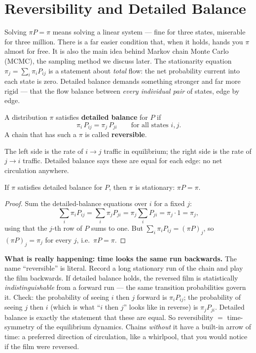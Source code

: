 \section{Reversibility and Detailed Balance}
\label{ch24:reversibility}
Solving $\pi P = \pi$ means solving a linear system --- fine for three states,
miserable for three million. There is a far easier condition that, when
it holds, hands you $\pi$ almost for free. It is also the main idea behind Markov chain Monte Carlo (MCMC), the sampling method we discuss later.
The stationarity equation $\pi_j = \sum_i \pi_i P_{ij}$ is a statement about
\emph{total} flow: the net probability current into each state is zero. Detailed
balance demands something stronger and far more rigid --- that the flow balance
between \emph{every individual pair} of states, edge by edge.
\begin{definition}
\label{ch24:def-detailed-balance}
A distribution $\pi$ satisfies \textbf{detailed balance} for $P$ if
\[
  \pi_i\, P_{ij} = \pi_j\, P_{ji} \qquad \text{for all states } i,j .
\]
A chain that has such a $\pi$ is called \textbf{reversible}.
\end{definition}
The left side is the rate of $i\to j$ traffic in equilibrium; the right side is
the rate of $j\to i$ traffic. Detailed balance says these are equal for each edge:
no net circulation anywhere.
\begin{theorem}
\label{ch24:thm-db-implies-stationary}
If $\pi$ satisfies detailed balance for $P$, then $\pi$ is stationary: $\pi P = \pi$.
\end{theorem}
\begin{proof}
Sum the detailed-balance equations over $i$ for a fixed $j$:
\[
  \sum_i \pi_i P_{ij} = \sum_i \pi_j P_{ji} = \pi_j \sum_i P_{ji} = \pi_j \cdot 1 = \pi_j ,
\]
using that the $j$-th row of $P$ sums to one. But $\sum_i \pi_i P_{ij} = (\pi P)_j$,
so $(\pi P)_j = \pi_j$ for every $j$, i.e.\ $\pi P = \pi$.
\end{proof}
\begin{happeningbox}
\textbf{What is really happening: time looks the same run backwards.} The name
``reversible'' is literal. Record a long stationary run of the chain and play the
film backwards. If detailed balance holds, the reversed film is statistically
\emph{indistinguishable} from a forward run --- the same transition probabilities
govern it. Check: the probability of seeing $i$ then $j$ forward is
$\pi_i P_{ij}$; the probability of seeing $j$ then $i$ (which is what
``$i$ then $j$'' looks like in reverse) is $\pi_j P_{ji}$. Detailed balance is
exactly the statement that these are equal. So reversibility $=$ time-symmetry of
the equilibrium dynamics. Chains \emph{without} it have a built-in arrow of time:
a preferred direction of circulation, like a whirlpool, that you would notice if
the film were reversed.
\end{happeningbox}

